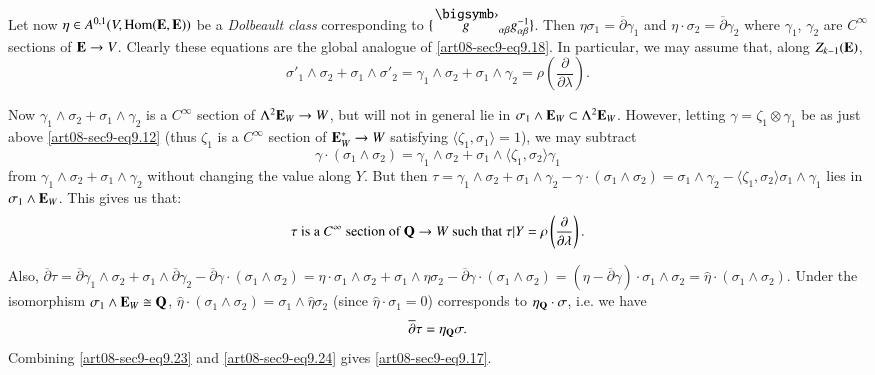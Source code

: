 Let now $\eta\in A^{0,1}(V,\operatorname{\mathrm{Hom}}(\mathbf{E},\mathbf{E}))$ be a {\em Dolbeault class} corresponding to $\{\overdot{g}_{\alpha\beta}g^{-1}_{\alpha\beta}\}$. Then $\eta\sigma_{1}=\overline{\partial}\gamma_{1}$ and $\eta\cdot \sigma_{2}=\overline{\partial}\gamma_{2}$ where $\gamma_{1}$, $\gamma_{2}$ are $C^{\infty}$ sections of $\mathbf{E}\to V$. Clearly these equations are the global analogue of \eqref{art08-sec9-eq9.18}. In particular, we may assume that, along $Z_{k-1}(\mathbf{E})$,
\begin{equation}
\sigma'_{1}\wedge \sigma_{2}+\sigma_{1}\wedge \sigma'_{2}=\gamma_{1}\wedge \sigma_{2}+\sigma_{1}\wedge \gamma_{2}=\rho\left(\dfrac{\partial}{\partial\lambda}\right).\label{art08-sec9-eq9.22}
\end{equation}\pageoriginale

Now $\gamma_{1}\wedge \sigma_{2}+\sigma_{1}\wedge\gamma_{2}$ is a $C^{\infty}$ section of $\Lambda^{2}\mathbf{E}_{W}\to W$, but will not in general lie in $\sigma_{1}\wedge \mathbf{E}_{W}\subset \Lambda^{2}\mathbf{E}_{W}$. However, letting $\gamma=\zeta_{1}\otimes \gamma_{1}$ be as just above \eqref{art08-sec9-eq9.12} (thus $\zeta_{1}$ is a $C^{\infty}$ section of $\mathbf{E}^{*}_{W}\to W$ satisfying $\langle\zeta_{1},\sigma_{1}\rangle=1$), we may subtract
$$
\gamma\cdot (\sigma_{1}\wedge\sigma_{2})=\gamma_{1}\wedge\sigma_{2}+\sigma_{1}\wedge\langle \zeta_{1},\sigma_{2}\rangle \gamma_{1}
$$
from $\gamma_{1}\wedge\sigma_{2}+\sigma_{1}\wedge\gamma_{2}$ without changing the value along $Y$. But then $\tau=\gamma_{1}\wedge\sigma_{2}+\sigma_{1}\wedge\gamma_{2}-\gamma\cdot (\sigma_{1}\wedge\sigma_{2})=\sigma_{1}\wedge\gamma_{2}-\langle \zeta_{1},\sigma_{2}\rangle\sigma_{1}\wedge\gamma_{1}$ lies in $\sigma_{1}\wedge \mathbf{E}_{W}$. This gives us that:
\begin{equation}
\tau\text{ is a $C^{\infty}$ section of } \mathbf{Q}\to W\text{ such that } \tau|Y=\rho\left(\frac{\partial}{\partial\lambda}\right).\label{art08-sec9-eq9.23}
\end{equation}

Also, $\overline{\partial}\tau=\overline{\partial}\gamma_{1}\wedge \sigma_{2}+\sigma_{1}\wedge\overline{\partial}\gamma_{2}-\overline{\partial}\gamma\cdot (\sigma_{1}\wedge\sigma_{2})= \eta\cdot \sigma_{1}\wedge\sigma_{2}+\sigma_{1}\wedge\eta\sigma_{2}-\overline{\partial}\gamma\cdot (\sigma_{1}\wedge\sigma_{2})=(\eta-\overline{\partial}\gamma)\cdot \sigma_{1}\wedge\sigma_{2}=\widehat{\eta}\cdot (\sigma_{1}\wedge\sigma_{2})$. Under the isomorphism $\sigma_{1}\wedge\mathbf{E}_{W}\cong \mathbf{Q}$, $\widehat{\eta}\cdot (\sigma_{1}\wedge\sigma_{2})=\sigma_{1}\wedge\widehat{\eta}\sigma_{2}$ (since $\widehat{\eta}\cdot \sigma_{1}=0$) corresponds to $\eta_{\mathbf{Q}}\cdot \sigma$, i.e. we have
\begin{equation}
\overline{\partial}\tau=\eta_{\mathbf{Q}}\sigma.\label{art08-sec9-eq9.24}
\end{equation}
Combining \eqref{art08-sec9-eq9.23} and \eqref{art08-sec9-eq9.24} gives \eqref{art08-sec9-eq9.17}.

